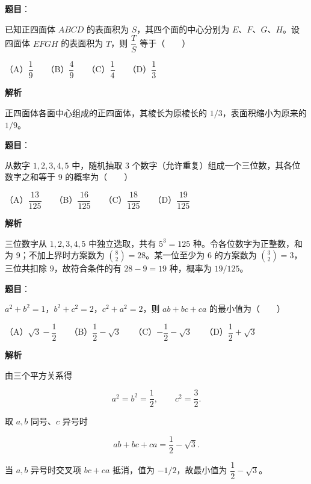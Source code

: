 \begin{answer}

\textbf{题目}：

已知正四面体 $ABCD$ 的表面积为 $S$，其四个面的中心分别为 $E\text{、}F\text{、}G\text{、}H$。设四面体 $EFGH$ 的表面积为 $T$，则 $\dfrac TS$ 等于\mbox{（　　）}

（A）$\dfrac19$　　（B）$\dfrac49$　　（C）$\dfrac14$　　（D）$\dfrac13$

\textbf{解析}

正四面体各面中心组成的正四面体，其棱长为原棱长的 $1/3$，表面积缩小为原来的 $1/9$。


\end{answer}
\begin{answer}

\textbf{题目}：

从数字 $1,2,3,4,5$ 中，随机抽取 3 个数字（允许重复）组成一个三位数，其各位数字之和等于 9 的概率为\mbox{（　　）}

（A）$\dfrac{13}{125}$　　（B）$\dfrac{16}{125}$　　（C）$\dfrac{18}{125}$　　（D）$\dfrac{19}{125}$

\textbf{解析}

三位数字从 $1,2,3,4,5$ 中独立选取，共有 $5^3=125$ 种。令各位数字为正整数，和为 9；不加上界时方案数为 $\binom82=28$。某一位至少为 6 的方案数为 $\binom32=3$，三位共扣除 $9$，故符合条件的有 $28-9=19$ 种，概率为 $19/125$。


\end{answer}
\begin{answer}

\textbf{题目}：

$a^2+b^2=1$，$b^2+c^2=2$，$c^2+a^2=2$，则 $ab+bc+ca$ 的最小值为\mbox{（　　）}

（A）$\sqrt3-\dfrac12$　　（B）$\dfrac12-\sqrt3$　　（C）$-\dfrac12-\sqrt3$　　（D）$\dfrac12+\sqrt3$

\textbf{解析}

由三个平方关系得

\nopagebreak[4]
\[
a^2=b^2=\frac12,\qquad c^2=\frac32.
\]

取 $a,b$ 同号、$c$ 异号时

\nopagebreak[4]
\[
ab+bc+ca=\frac12-\sqrt3.
\]

当 $a,b$ 异号时交叉项 $bc+ca$ 抵消，值为 $-1/2$，故最小值为 $\dfrac12-\sqrt3$。


\end{answer}
